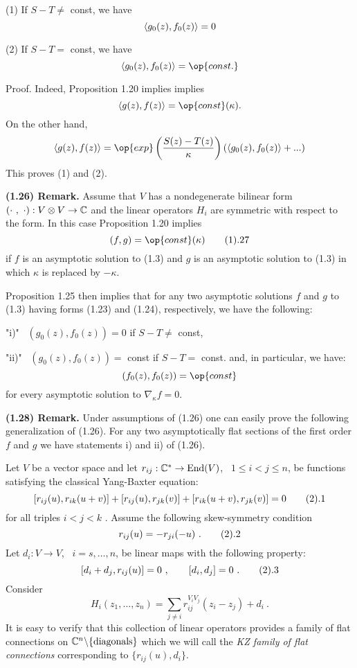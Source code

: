  (1) If $S - T \neq$ const, we have
$$
\langle g_0(z),f_0(z)\rangle = 0
$$

(2) If $S - T =$ const, we have
$$
\< g_0(z),f_0(z)\> = {\op{const.}}
$$
\endproclaim

{\smc Proof.} Indeed, Proposition 1.20 implies
implies
$$
\< g(z),f(z)\> = {\op{const}}(\kappa) .
$$
On the other hand,
$$
\< g(z),f(z)\> = {\op{exp}}
\left( \frac{S(z)-T(z)}{\kappa} \right)
(\< g_0(z),f_0(z)\> + ...)
$$
This proves (1) and (2).

\bigskip
{\bf (1.26) Remark. } Assume that $V$ has a nondegenerate bilinear form
$(\cdot \ , \ \cdot ): V\otimes V\to\Bbb C$ and the linear operators
$H_i$ are symmetric with respect to the form.
 In this case Proposition 1.20
implies
$$
(f,g) = {\op{const}}(\kappa)   \tag 1.27
$$
if $ f$ is an asymptotic
solution to (1.3) and $g$ is an asymptotic solution to (1.3) in which $\kappa$
is replaced by $-\kappa$.

Proposition 1.25 then
implies that for any two asymptotic solutions $f$ and $g$
to (1.3) having forms (1.23) and (1.24), respectively,
we have the following:
\roster
\item"i)"  \ $(g_0(z),f_0(z)) = 0$ if $S - T \neq $ const,
\item"ii)" \ $(g_0(z),f_0(z)) =$ const   if $S - T = $ const.
\endroster
and, in particular, we have:
$$
(f_0(z),f_0(z)) = {\op{const}}
$$
for every asymptotic solution to $\nabla_\kappa f=0$.


{\bf (1.28) Remark. } Under assumptions of (1.26) one
can easily prove the following generalization
of (1.26). For any two asymptotically flat sections of the first
order $f$ and $g$ we have statements i) and ii) of (1.26).


\bigskip\bigskip




Let $V$ be a vector space and let $r_{ij}: \Bbb C ^*  \to {\text{End}}(V)$,
\ $1\leq i < j \leq n$, be functions satisfying the classical
Yang-Baxter equation:
$$
  [r_{ij}(u),r_{ik}(u+v)]+[r_{ij}(u),r_{jk}(v)]
+ [r_{ik}(u+v),r_{jk}(v)] = 0     \tag 2.1
$$
for all triples $i < j < k$ . Assume the following skew-symmetry
condition
$$
r_{ij}(u) = -r_{ji}(-u) \ .   \tag 2.2
$$
Let $d_i : V\to V$, \ $i=s,\dots ,n$,  be linear maps with  the
following property:
$$
[d_i+d_j, r_{ij}(u)] = 0 \ , \qquad [d_i,d_j]=0   \ .
\tag 2.3
$$
Consider
$$
H_i(z_1,\dots ,z_n) = \sum_{j\neq i}
r_{ij}^{V_iV_j} (z_i-z_j)+d_i   \ .
$$
It is easy to verify that this collection of linear operators
 provides a family of flat connections on $\Bbb C^n\backslash\{
{\text{diagonals}}\}$ which we will call the {\it KZ family of flat
connections} corresponding to $\{ r_{ij}(u),d_i\}$.

